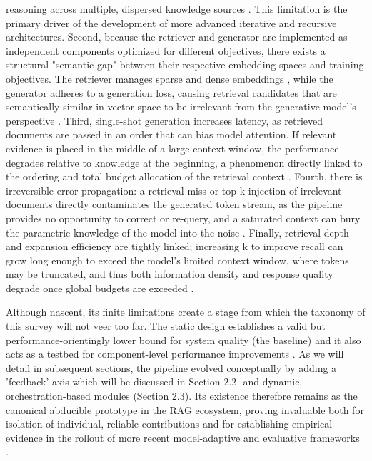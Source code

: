 \documentclass[11pt,a4paper]{article}
\begin{document}
reasoning across multiple, dispersed knowledge sources \cite{arxiv:2509.10697v1,arxiv:2506.00054v1}. This limitation is the primary driver of the development of more advanced iterative and recursive architectures. Second, because the retriever and generator are implemented as independent components optimized for different objectives, there exists a structural "semantic gap" between their respective embedding spaces and training objectives. The retriever manages sparse and dense embeddings \cite{arxiv:2407.01219v1}, while the generator adheres to a generation loss, causing retrieval candidates that are semantically similar in vector space to be irrelevant from the generative model's perspective \cite{arxiv:2406.13249v1}. Third, single-shot generation increases latency, as retrieved documents are passed in an order that can bias model attention. If relevant evidence is placed in the middle of a large context window, the performance degrades relative to knowledge at the beginning, a phenomenon directly linked to the ordering and total budget allocation of the retrieval context \cite{arxiv:2401.14887v3}. Fourth, there is irreversible error propagation: a retrieval miss or top-k injection of irrelevant documents directly contaminates the generated token stream, as the pipeline provides no opportunity to correct or re-query, and a saturated context can bury the parametric knowledge of the model into the noise \cite{arxiv:2401.15884v2,arxiv:2401.14887v3}. Finally, retrieval depth and expansion efficiency are tightly linked; increasing k to improve recall can grow long enough to exceed the model's limited context window, where tokens may be truncated, and thus both information density and response quality degrade once global budgets are exceeded \cite{arxiv:2404.10981v1,arxiv:2407.01219v1}.

Although nascent, its finite limitations create a stage from which the taxonomy of this survey will not veer too far. The static design establishes a valid but performance-orientingly lower bound for system quality (the baseline) and it also acts as a testbed for component-level performance improvements \cite{arxiv:2407.01219v1}. As we will detail in subsequent sections, the pipeline evolved conceptually by adding a 'feedback' axis-which will be discussed in Section 2.2- and dynamic, orchestration-based modules (Section 2.3). Its existence therefore remains as the canonical abducible prototype in the RAG ecosystem, proving invaluable both for isolation of individual, reliable contributions \cite{arxiv:2408.08067v2} and for establishing empirical evidence in the rollout of more recent model-adaptive and evaluative frameworks \cite{arxiv:2412.15246v1}.
\end{document}
